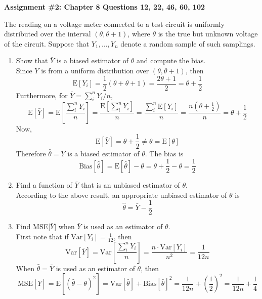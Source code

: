 \documentclass[12pt]{article}
\newcommand{\ques}[1]{\noindent {\bf Question #1: }}
\begin{document}
\begin{center} \textbf{Assignment \#2: Chapter 8 Questions 12, 22, 46, 60, 102} \end{center}

\ques{8.12} The reading on a voltage meter connected to a test circuit is uniformly distributed over the interval $(\theta, \theta+1)$, where $\theta$ is the true but unknown voltage of the circuit. Suppose that $Y_1,\dots,Y_n$ denote a random sample of such samplings.
\begin{enumerate} 
\item Show that $\bar{Y}$ is a biased estimator of $\theta$ and compute the bias. \\
Since $Y$ is from a uniform distribution over $(\theta, \theta+1)$, then 
$$ \text{E}[Y_i] = \frac{1}{2}(\theta + \theta + 1) = \frac{2\theta + 1}{2} = \theta + \frac{1}{2} $$ Furthermore, for $\bar{Y} = \sum_i^n Y_i / n $,
$$ \text{E}[\bar{Y}] = \text{E}\left[ \frac{\sum_i^n Y_i}{n} \right] = \frac{\text{E}[\sum_i^n Y_i]}{n} = \frac{ \sum_i^n \text{E}[Y_i]}{n} = \frac{n\left( \theta + \frac{1}{2}\right)}{n} = \theta + \frac{1}{2} $$ 
Now, $$ \text{E}[\bar{Y}] = \theta + \frac{1}{2} \neq \theta = \text{E}[\theta] $$ 
Therefore $\hat{\theta} = \bar{Y}$ is a biased estimator of $\theta$. The bias is
$$ \text{Bias}[\hat{\theta}] = \text{E}[\hat{\theta}] - \theta = \theta + \frac{1}{2} - \theta = \frac{1}{2} $$ 

\item Find a function of $\bar{Y}$ that is an unbiased estimator of $\theta$. \\
According to the above result, an appropriate unbiased estimator of $\theta$ is 
$$ \hat{\theta} = \bar{Y} - \frac{1}{2} $$ 

\item Find MSE[$\bar{Y}$] when $\bar{Y}$ is used as an estimator of $\theta$.  \\
First note that if $ \text{Var}[Y_i] = \frac{1}{12}$, then $$ \text{Var}[\bar{Y}] = \text{Var}\left[ \frac{\sum_i^n Y_i}{n}\right] = \frac{n \cdot \text{Var}[Y_i]}{n^2} = \frac{1}{12n} $$ 
When $\hat{\theta} = \bar{Y}$ is used as an estimator of $\theta$, then $$ \text{MSE}[\bar{Y}] = \text{E}[(\hat{\theta} - \theta)^2] = \text{Var}[\hat{\theta}] + \text{Bias}[\hat{\theta}]^2 = \frac{1}{12n} + \left(\frac{1}{2}\right)^2 = \frac{1}{12n} + \frac{1}{4} $$ 

\end{enumerate} 
\newpage
\end{document}
